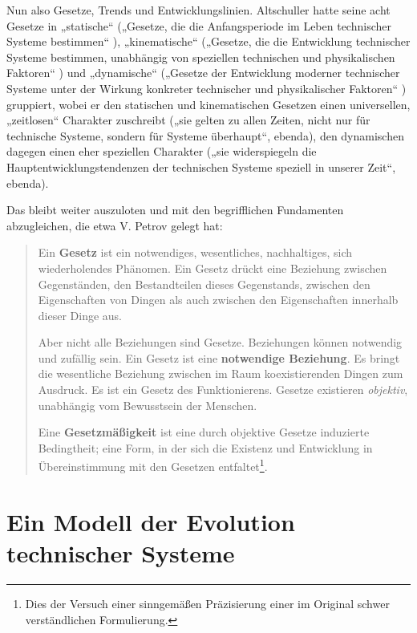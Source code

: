 \documentclass[11pt,a4paper]{article}
\begin{document}
Nun also Gesetze, Trends und Entwicklungslinien. Altschuller hatte seine acht
Gesetze in „statische“ („Gesetze, die die Anfangsperiode im Leben technischer
Systeme bestimmen“ \cite[S. 124]{Altschuller1984}), „kinematische“ („Gesetze,
die die Entwicklung technischer Systeme bestimmen, unabhängig von speziellen
technischen und physikalischen Faktoren“ \cite[S. 126]{Altschuller1984}) und
„dynamische“ („Gesetze der Entwicklung moderner technischer Systeme unter der
Wirkung konkreter technischer und physikalischer Faktoren“
\cite[S. 127]{Altschuller1984}) gruppiert, wobei er den statischen und
kinematischen Gesetzen einen universellen, „zeitlosen“ Charakter zuschreibt
(„sie gelten zu allen Zeiten, nicht nur für technische Systeme, sondern für
Systeme überhaupt“, ebenda), den dynamischen dagegen einen eher speziellen
Charakter („sie widerspiegeln die Hauptentwicklungstendenzen der technischen
Systeme speziell in unserer Zeit“, ebenda).

Das bleibt weiter auszuloten und mit den begriff\-lichen Fundamenten
abzugleichen, die etwa V. Petrov \cite{Petrov2020a} gelegt hat:
\begin{quote}
  Ein \textbf{Gesetz} ist ein notwendiges, wesentliches, nachhaltiges, sich
  wiederholendes Phänomen. Ein Gesetz drückt eine Beziehung zwischen
  Gegenständen, den Bestandteilen dieses Gegenstands, zwischen den
  Eigenschaften von Dingen als auch zwischen den Eigenschaften innerhalb
  dieser Dinge aus.

  Aber nicht alle Beziehungen sind Gesetze. Beziehungen können notwendig und
  zufällig sein.  Ein Gesetz ist eine \textbf{notwendige Beziehung}. Es bringt
  die wesentliche Beziehung zwischen im Raum koexistierenden Dingen zum
  Ausdruck. Es ist ein Gesetz des Funktionierens.  Gesetze existieren
  \emph{objektiv}, unabhängig vom Bewusstsein der Menschen.

  Eine \textbf{Gesetzmäßigkeit} ist eine durch objektive Gesetze induzierte
  Bedingtheit; eine Form, in der sich die Existenz und Entwicklung in
  Übereinstimmung mit den Gesetzen entfaltet\footnote{Dies der Versuch einer
    sinngemäßen Präzisierung einer im Original schwer verständlichen
    Formulierung.}.
\end{quote}

\section{Ein Modell der Evolution technischer Systeme}
\end{document}
